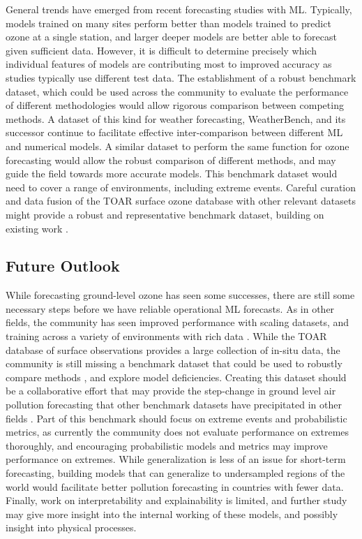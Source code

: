 \documentclass[gmd, manuscript]{copernicus}
\begin{document}
General trends have emerged from recent forecasting studies with ML. Typically, models trained on many sites perform better than models trained to predict ozone at a single station, and larger deeper models are better able to forecast given sufficient data. However, it is difficult to determine precisely which individual features of models are contributing most to improved accuracy as studies typically use different test data. The establishment of a robust benchmark dataset, which could be used across the community to evaluate the performance of different methodologies would allow rigorous comparison between competing methods. A dataset of this kind for weather forecasting, WeatherBench, and its successor \citep{Rasp2020, Rasp2024} continue to facilitate effective inter-comparison between different ML and numerical models. A similar dataset to perform the same function for ozone forecasting would allow the robust comparison of different methods, and may guide the field towards more accurate models. This benchmark dataset would need to cover a range of environments, including extreme events. Careful curation and data fusion of the TOAR surface ozone database with other relevant datasets might provide a robust and representative benchmark dataset, building on existing work \citep{Betancourt2021}.

\subsection{Future Outlook}
While forecasting ground-level ozone has seen some successes, there are still some necessary steps before we have reliable operational ML forecasts. As in other fields, the community has seen improved performance with scaling datasets, and training across a variety of environments with rich data \citep{leufen_o3resnet_2023}. While  the TOAR database of surface observations provides a large collection of in-situ data, the community is still missing a benchmark dataset that could be used to robustly compare methods \citep{Dueben2022, Rasp2024}, and explore model deficiencies. Creating this dataset should be a collaborative effort that may provide the step-change in ground level air pollution forecasting that other benchmark datasets have precipitated in other fields \citep{Deng2009}. Part of this benchmark should focus on extreme events and probabilistic metrics, as currently the community does not evaluate performance on extremes thoroughly, and encouraging probabilistic models and metrics may improve performance on extremes. While generalization is less of an issue for short-term forecasting, building models that can generalize to undersampled regions of the world would facilitate better pollution forecasting in countries with fewer data. Finally, work on interpretability and explainability is limited, and further study may give more insight into the internal working of these models, and possibly insight into physical processes.
\end{document}
